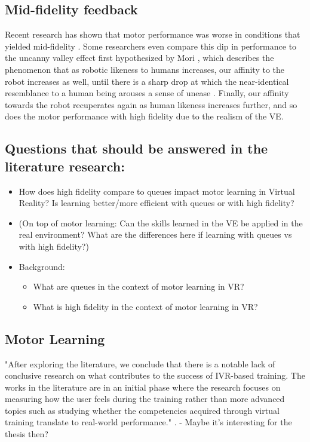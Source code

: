 \subsection{Mid-fidelity feedback}
Recent research has shown that motor performance was worse in conditions that yielded mid-fidelity \cite{MahdiNabiyouni201520153DUI.}.
Some researchers even compare this dip in performance to the uncanny valley effect first hypothesized by Mori \cite{Mori2012TheValley}, which describes the phenomenon that as robotic likeness to humans increases, our affinity to the robot increases as well, until there is a sharp drop at which the near-identical resemblance to a human being arouses a sense of unease \cite{Bhargava2018EvaluatingSimulations}. Finally, our affinity towards the robot recuperates again as human likeness increases further, and so does the motor performance with high fidelity due to the realism of the VE. 


\subsection{Questions that should be answered in the literature research:}

\begin{itemize}
    \item How does high fidelity compare to queues impact motor learning in Virtual Reality? Is learning better/more efficient with queues or with high fidelity?
    \item (On top of motor learning: Can the skills learned in the VE be applied in the real environment? What are the differences here if learning with queues vs with high fidelity?)
    \item Background:
    \begin{itemize}
        \item What are queues in the context of motor learning in VR?
        \item What is high fidelity in the context of motor learning in VR?
    \end{itemize}
\end{itemize}

\subsection{Motor Learning}

"After exploring the literature, we conclude that there is a notable lack of
conclusive research on what contributes to the success of IVR-based training. The works in
the literature are in an initial phase where the research focuses on measuring how the user
feels during the training rather than more advanced topics such as studying whether the
competencies acquired through virtual training translate to real-world performance." \cite{Narciso2021}.
- Maybe it's interesting for the thesis then?

